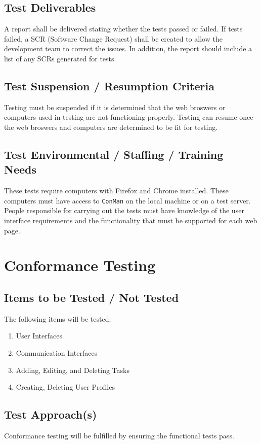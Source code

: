 \documentclass{article}
\begin{document}
\subsection{Test Deliverables}
A report shall be delivered stating whether the tests passed or failed. If tests 
failed, a SCR (Software Change Request) shall be created to allow the development 
team to correct the issues. In addition, the report should include a list of any 
SCRs generated for tests.

\subsection{Test Suspension / Resumption Criteria}
Testing must be suspended if it is determined that the web broswers or computers 
used in testing are not functioning properly. Testing can resume once the web 
broswers and computers are determined to be fit for testing. 

\subsection{Test Environmental / Staffing / Training Needs}
These tests require computers with Firefox and Chrome installed. These computers 
must have access to \texttt{ConMan} on the local machine or on a test server. People 
responsible for carrying out the tests must have knowledge of the user interface 
requirements and the functionality that must be supported for each web page.

\newpage
\section{Conformance Testing}
\subsection{Items to be Tested / Not Tested}
The following items will be tested:
\begin{enumerate}
\item User Interfaces
\item Communication Interfaces
\item Adding, Editing, and Deleting Tasks
\item Creating, Deleting User Profiles
\end{enumerate}

\subsection{Test Approach(s)}
Conformance testing will be fulfilled by ensuring the functional tests pass.
\end{document}
